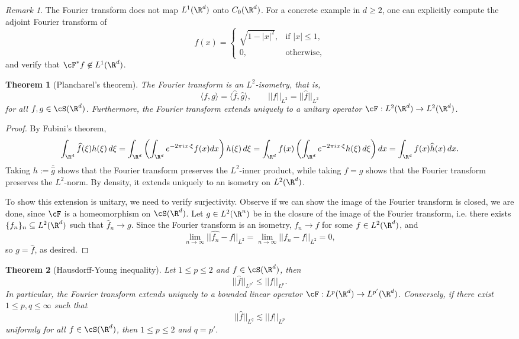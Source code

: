 \documentclass[reqno]{amsart}
\newtheorem{theorem}{Theorem}
\theoremstyle{definition}
\theoremstyle{remark}
\newtheorem*{remark}{Remark}
\begin{document}
\begin{remark}
	The Fourier transform does not map $L^1 (\R^d)$ onto $C_0 (\R^d)$. For a concrete example in $d \geq 2$, one can explicitly compute the adjoint Fourier transform of 
		\[
			f(x)
				=
				\begin{cases}
					\sqrt{1 - |x|^2}, 		&\text{if } |x| \leq 1, \\
					0, 								&\text{otherwise},
				\end{cases}
		\]
	and verify that $\cF^* f \not\in L^1 (\R^d)$.
\end{remark}

\begin{theorem}[Plancharel's theorem]
	The Fourier transform is an $L^2$-isometry, that is, 
		\[ \langle f, g \rangle = \langle \widehat f, \widehat g \rangle, \qquad ||f||_{L^2} = ||\widehat f||_{L^2} \]
	for all $f, g \in \cS (\R^d)$. Furthermore, the Fourier transform extends uniquely to a unitary operator $\cF : L^2 (\R^d) \to L^2 (\R^d)$. 
\end{theorem}

\begin{proof}
	By Fubini's theorem, 
		\[ \int_{\R^d} \widehat f (\xi) h(\xi) \, d \xi = \int_{\R^d} \left( \int_{\R^d} e^{-2\pi i x \cdot \xi} f(x)  dx  \right)h(\xi) \, d \xi = \int_{\R^d} f(x) \left( \int_{\R^d} e^{-2\pi i x \cdot \xi} h(\xi) \, d \xi \right) d x = \int_{\R^d} f(x) \widehat h(x) \, dx.\]
	Taking $h := \overline{\widehat g}$ shows that the Fourier transform preserves the $L^2$-inner product, while taking $f = g$ shows that the Fourier transform preserves the $L^2$-norm. By density, it extends uniquely to an isometry on $L^2 (\R^d)$. 
	
	To show this extension is unitary, we need to verify surjectivity. Observe if we can show the image of the Fourier transform is closed, we are done, since $\cF$ is a homeomorphism on $\cS (\R^d)$. Let $g \in L^2 (\R^n)$ be in the closure of the image of the Fourier transform, i.e. there exists $\{ f_n \}_n \subseteq L^2 (\R^d)$ such that $\widehat f_n \to g$. Since the Fourier transform is an isometry, $f_n \to f$ for some $f \in L^2 (\R^d)$, and
		\[ \lim_{n \to \infty} ||\widehat{f_n} - \widehat f||_{L^2} = \lim_{n \to \infty} ||f_n - f||_{L^2} = 0,  \]
	so $g = \widehat f$, as desired. 		
\end{proof}


\begin{theorem}[Hausdorff-Young inequality]
	Let $1 \leq p \leq 2$ and $f\in \cS (\R^d)$, then 
		\[ ||\widehat f ||_{L^{p'}} \leq ||f||_{L^p}. \]
	In particular, the Fourier transform extends uniquely to a bounded linear operator $\cF : L^p (\R^d) \to L^{p'} (\R^d)$. Conversely, if there exist $1 \leq p, q \leq \infty$ such that
		\[  ||\widehat f ||_{L^{q}} \lesssim ||f||_{L^p} \]	
	uniformly for all $f \in \cS (\R^d)$, then $1 \leq p \leq 2$ and $q = p'$. 	
\end{theorem}
\end{document}
